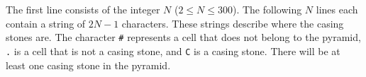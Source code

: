 
The first line consists of the integer $N$ ($2 \leq N \leq 300$).
The following $N$ lines each contain a string of $2N - 1$ characters. These strings describe
where the casing stones are. The character \verb|#| represents a cell that does not belong to 
the pyramid, \verb|.| is a cell that is not a casing stone, and \verb|C| is a casing stone.
There will be at least one casing stone in the pyramid.


